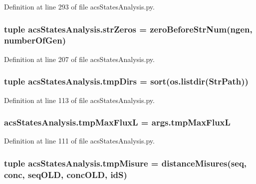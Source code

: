 Definition at line 293 of file acs\-States\-Analysis.\-py.

\hypertarget{a00130_a292c23aa303304f24632662a5dfbfa23}{
\subsubsection[{str\-Zeros}]{\setlength{\rightskip}{0pt plus 5cm}tuple acs\-States\-Analysis.\-str\-Zeros = {\bf zero\-Before\-Str\-Num}(ngen, {\bf number\-Of\-Gen})}}\label{a00130_a292c23aa303304f24632662a5dfbfa23}


Definition at line 207 of file acs\-States\-Analysis.\-py.

\hypertarget{a00130_ab71c19ee20acae0f07934a8d0e9fe50b}{
\subsubsection[{tmp\-Dirs}]{\setlength{\rightskip}{0pt plus 5cm}tuple acs\-States\-Analysis.\-tmp\-Dirs = sort(os.\-listdir({\bf Str\-Path}))}}\label{a00130_ab71c19ee20acae0f07934a8d0e9fe50b}


Definition at line 113 of file acs\-States\-Analysis.\-py.

\hypertarget{a00130_a22a52c6b87e96dc826bc621ee88c380a}{
\subsubsection[{tmp\-Max\-Flux\-L}]{\setlength{\rightskip}{0pt plus 5cm}acs\-States\-Analysis.\-tmp\-Max\-Flux\-L = args.\-tmp\-Max\-Flux\-L}}\label{a00130_a22a52c6b87e96dc826bc621ee88c380a}


Definition at line 111 of file acs\-States\-Analysis.\-py.

\hypertarget{a00130_a45529ce20ca353ca8ac251b4e88c91ff}{
\subsubsection[{tmp\-Misure}]{\setlength{\rightskip}{0pt plus 5cm}tuple acs\-States\-Analysis.\-tmp\-Misure = {\bf distance\-Misures}({\bf seq}, {\bf conc}, {\bf seq\-O\-L\-D}, {\bf conc\-O\-L\-D}, id\-S)}}\label{a00130_a45529ce20ca353ca8ac251b4e88c91ff}


